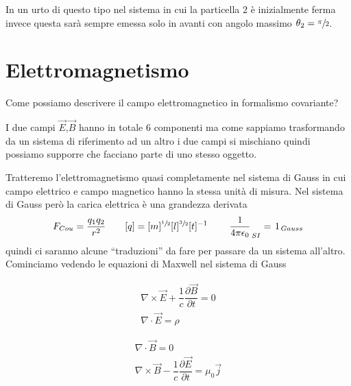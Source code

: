 \documentclass[12pt,a4paper,titlepage, twoside, openright]{book}
\numberwithin{equation}{chapter}
\begin{document}
In un urto di questo tipo nel sistema in cui la particella $2$ è inizialmente ferma invece questa sarà sempre emessa solo in avanti con angolo massimo $\theta_2=\sfrac{\pi}{2}$.








\chapter{Elettromagnetismo}
Come possiamo descrivere il campo elettromagnetico in formalismo covariante?

I due campi $\vec{E}$,$\vec{B}$ hanno in totale $6$ componenti ma come sappiamo trasformando da un sistema di riferimento ad un altro i due campi si mischiano quindi possiamo supporre che facciano parte di uno stesso oggetto.

Tratteremo l'elettromagnetismo quasi completamente nel sistema di Gauss in cui campo elettrico e campo magnetico hanno la stessa unità di misura. Nel sistema di Gauss però la carica elettrica è una grandezza derivata 
\[
F_{Cou}=\dfrac{q_1q_2}{r^2} \qquad [q]=[m]^{\sfrac{1}{2}} [l]^{\sfrac{3}{2}} [t]^{-1} \qquad \left.\dfrac{1}{4\pi\epsilon_0}\right._{SI}=\left. 1 \right._{Gauss}
\]
quindi ci saranno alcune ``traduzioni'' da fare per passare da un sistema all'altro.
Cominciamo vedendo le equazioni di Maxwell nel sistema di Gauss

\begin{table}[H]
\begin{minipage}[H]{0.45\linewidth}
\centering
\begin{align} \label{eqRotoreElettricoGauss}
\nabla\times\vec{E}+\dfrac{1}{c}\dfrac{\partial \vec{B}}{\partial t}=0  \\
\nabla \cdot \vec{E}=\rho \label{eqDivergenzaElettricoGauss}
\end{align}
\end{minipage}
\begin{minipage}[H]{0.45\linewidth}
\centering
\begin{align} \label{eqDivergenzaMagneticoGauss}
\nabla \cdot \vec{B}= 0 \\
\nabla\times\vec{B} - \dfrac{1}{c} \dfrac{\partial \vec{E}}{\partial t} =\mu_0\vec{j} \label{eqRotoreMagneticoGauss}
\end{align}
\end{minipage}
\end{table}
\end{document}
